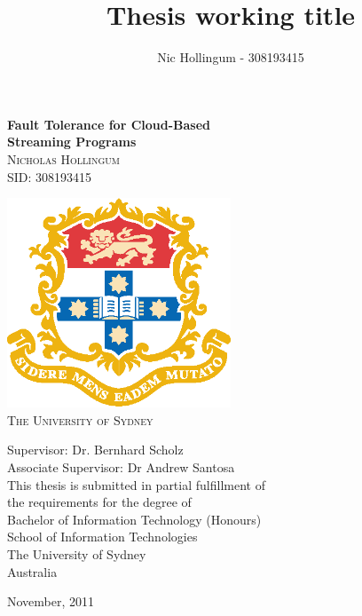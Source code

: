 \documentclass{report}
\author{Nic Hollingum - 308193415}
\title{Thesis working title}
\begin{document}
\addtolength{\headheight}{2.5pt}
\onehalfspace
\pagestyle{fancy}
\fancyhead{} %
\fancyhead[RE,LO]{\slshape \leftmark}
\fancyfoot{} %
\fancyfoot[C]{\thepage}
\renewcommand{\chaptermark}[1]{
\markboth{\thechapter.\ #1}{}}
\renewcommand{\headrulewidth}{0.4pt}
\renewcommand{\footrulewidth}{0.4pt}


\newcommand{\HRule}{\rule{\linewidth}{0.5mm}}
\begin{titlepage}
\begin{center}

	{\huge \bfseries Fault Tolerance for Cloud-Based}
	\\[0.3cm]
	{\huge \bfseries Streaming Programs}
	\\[0.6cm]
	
	\textsc{\LARGE 	Nicholas Hollingum	\\
					SID: 308193415		\\[0.6cm]}
	
	\includegraphics[width=0.50\textwidth]{figures/usyd.eps}\\[0.2cm]
  
  \textsc{\LARGE The University of Sydney}\\[0.8cm]
  
  
  \begin{center}
  \large Supervisor: Dr. Bernhard Scholz\\
  Associate Supervisor: Dr Andrew Santosa\\[0.4cm]

  This thesis is submitted in partial fulfillment of\\
  the requirements for the degree of\\
  Bachelor of Information Technology (Honours)\\[0.5cm]

  \Large School of Information Technologies\\
  The University of Sydney\\
  Australia
  \end{center}
  \vfill
  {\large November, 2011}
\end{center}
\end{titlepage}
\newpage
\newpage




\tableofcontents















\end{document}
